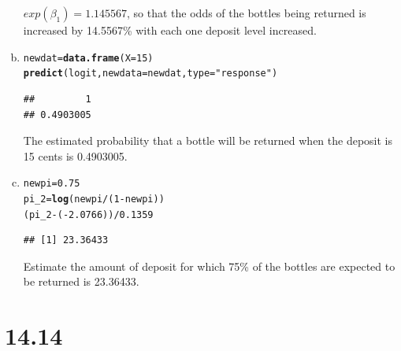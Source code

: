 \documentclass{article}\usepackage[]{graphicx}\usepackage[]{color}
\makeatletter
\newcommand{\hlnum}[1]{\textcolor[rgb]{0.686,0.059,0.569}{#1}}%
\newcommand{\hlstr}[1]{\textcolor[rgb]{0.192,0.494,0.8}{#1}}%
\newcommand{\hlopt}[1]{\textcolor[rgb]{0,0,0}{#1}}%
\newcommand{\hlstd}[1]{\textcolor[rgb]{0.345,0.345,0.345}{#1}}%
\newcommand{\hlkwb}[1]{\textcolor[rgb]{0.69,0.353,0.396}{#1}}%
\newcommand{\hlkwc}[1]{\textcolor[rgb]{0.333,0.667,0.333}{#1}}%
\newcommand{\hlkwd}[1]{\textcolor[rgb]{0.737,0.353,0.396}{\textbf{#1}}}%
\newenvironment{kframe}{%
 \def\at@end@of@kframe{}%
 \ifinner\ifhmode%
  \def\at@end@of@kframe{\end{minipage}}%
  \begin{minipage}{\columnwidth}%
 \fi\fi%
 \def\FrameCommand##1{\hskip\@totalleftmargin \hskip-\fboxsep
 \colorbox{shadecolor}{##1}\hskip-\fboxsep
     \hskip-\linewidth \hskip-\@totalleftmargin \hskip\columnwidth}%
 \MakeFramed {\advance\hsize-\width
   \@totalleftmargin\z@ \linewidth\hsize
   \@setminipage}}%
 {\par\unskip\endMakeFramed%
 \at@end@of@kframe}
\newenvironment{knitrout}{}{} %
\makeatother
\begin{document}
\begin{enumerate}[(a)]
\qquad $exp(\beta_1)=1.145567$, so that the odds of the bottles being returned is increased by 14.5567\% with each one deposit level increased.

\item

\begin{knitrout}
\color{fgcolor}\begin{kframe}
\begin{alltt}
  \hlstd{newdat} \hlkwb{=} \hlkwd{data.frame}\hlstd{(}\hlkwc{X} \hlstd{=} \hlnum{15}\hlstd{)}
  \hlkwd{predict}\hlstd{(logit,} \hlkwc{newdata} \hlstd{= newdat,} \hlkwc{type} \hlstd{=} \hlstr{"response"}\hlstd{)}
\end{alltt}
\begin{verbatim}
##         1 
## 0.4903005
\end{verbatim}
\end{kframe}
\end{knitrout}

\qquad The estimated probability that a bottle will be returned when the deposit is 15 cents is 0.4903005.

\item

\begin{knitrout}
\color{fgcolor}\begin{kframe}
\begin{alltt}
  \hlstd{newpi} \hlkwb{=} \hlnum{0.75}
  \hlstd{pi_2} \hlkwb{=} \hlkwd{log}\hlstd{(newpi}\hlopt{/}\hlstd{(}\hlnum{1}\hlopt{-}\hlstd{newpi))}
  \hlstd{(pi_2} \hlopt{-} \hlstd{(}\hlopt{-}\hlnum{2.0766}\hlstd{))}\hlopt{/}\hlnum{0.1359}
\end{alltt}
\begin{verbatim}
## [1] 23.36433
\end{verbatim}
\end{kframe}
\end{knitrout}

\qquad Estimate the amount of deposit for which 75\% of the bottles are expected to be returned is 23.36433.

\end{enumerate}

\section{14.14}
\end{document}

